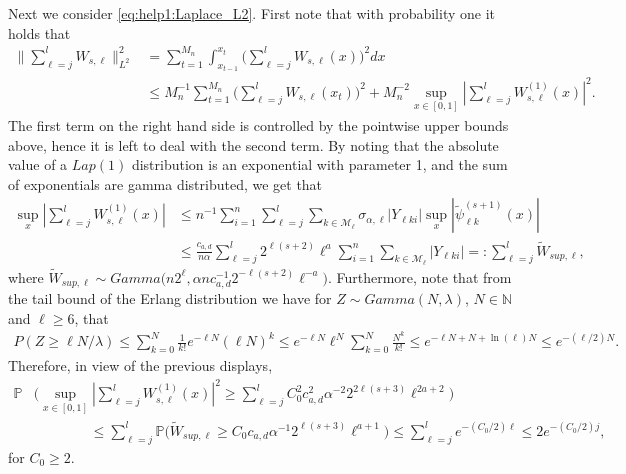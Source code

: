 \documentclass[preprint]{imsart}
\renewcommand{\P}{\mathbb{P}}
\numberwithin{equation}{section}
\newcounter{cond}
\begin{document}
\begin{appendix}
Next we consider \eqref{eq:help1:Laplace_L2}. First note that with probability one it holds that
\begin{align}
\|  \sum_{\ell=j}^{l} W_{s,\ell}\|_{L^2}^2 
&=
\sum_{t=1}^{M_n}\int_{x_{t-1}}^{x_t}\Big(\sum_{\ell=j}^l W_{s,\ell}(x)\Big)^2dx\nonumber\\
&\leq M_n^{-1}\sum_{t=1}^{M_n}  \Big(\sum_{\ell=j}^{l} W_{s,\ell}(x_t)\Big)^2+ M_n^{-2} \sup_{x\in[0,1]}|  \sum_{\ell=j}^{l} W_{s,\ell}^{(1)}(x)|^2. \label{eq:ub:L2:W}
\end{align}
The first term on the right hand side is controlled by the pointwise upper bounds above, hence it is left to deal with the second term. By noting that the absolute value of a $Lap(1)$ distribution is an exponential with parameter 1, and the sum of exponentials are gamma distributed, we get that
\begin{align*}
\sup_x| \sum_{\ell=j}^{l}W_{s,\ell}^{(1)}(x)|&\leq n^{-1}\sum_{i=1}^n\sum_{\ell=j}^{l}\sum_{k\in\mathcal{M}_\ell} \sigma_{\alpha,\ell}|Y_{\ell k i}| \sup_x| \tilde\psi_{\ell k}^{(s+1)}(x)|\\
&\leq \frac{c_{a,d} }{n \alpha}\sum_{\ell=j}^{l} 2^{\ell(s+2)}\ell^a\sum_{i=1}^n\sum_{k\in\mathcal{M}_\ell}|Y_{\ell k i}|=: \sum_{\ell=j}^{l}\tilde{W}_{sup,\ell},
\end{align*}
where $\tilde{W}_{sup,\ell}\sim Gamma\big(n2^\ell, \alpha n c_{a,d}^{-1}2^{-\ell(s+2)}\ell^{-a}\big)$. Furthermore, note that from the tail bound of the Erlang distribution we have for $Z\sim Gamma(N,\lambda)$, $N\in\mathbb{N}$ and $\ell \geq 6$, that
\begin{align*}
P(Z\geq \ell N/\lambda )\leq \sum_{k=0}^{N}\frac{1}{k!}e^{-\ell N}(\ell N)^k\leq e^ {-\ell N} \ell^{N}\sum_{k=0}^{N} \frac{N^k}{k!}\leq e^{-\ell N +N+\ln(\ell)N}\leq e^{-(\ell/2)N}.
\end{align*}
 Therefore, in view of the previous displays,
\begin{align*}
\P&\Big(  \sup_{x\in[0,1]}| \sum_{\ell=j}^{l} W_{s,\ell}^{(1)}(x)|^2\geq   \sum_{\ell=j}^{l}    C_0^2c_{a,d}^2\alpha^{-2} 2^{2\ell(s+3)}\ell^{2a+2}  \Big)\\
&\qquad\qquad \leq \sum_{\ell=j}^{l}  \P \big( \tilde{W}_{sup,\ell}\geq   C_0c_{a,d} \alpha^{-1}2^{\ell(s+3)}\ell^{a+1}   \big)\leq \sum_{\ell=j}^{l}e^{-(C_0/2)\ell}\leq 2 e^{-(C_0/2)j},
\end{align*}
for $C_0\geq 2$.


\end{appendix}
\end{document}
